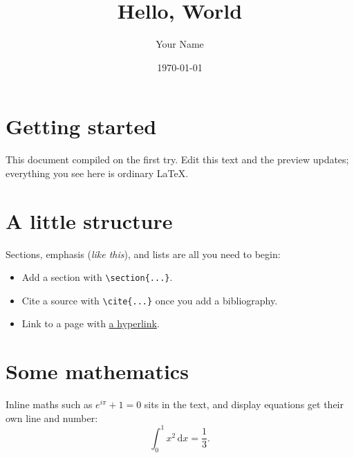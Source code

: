 \documentclass[11pt, a4paper]{article}
\title{Hello, World}
\author{Your Name}
\date{\today}
\begin{document}
\maketitle

\section{Getting started}
This document compiled on the first try. Edit this text and the preview
updates; everything you see here is ordinary \LaTeX{}.

\section{A little structure}
Sections, emphasis (\emph{like this}), and lists are all you need to begin:
\begin{itemize}
  \item Add a section with \verb|\section{...}|.
  \item Cite a source with \verb|\cite{...}| once you add a bibliography.
  \item Link to a page with \href{https://latextemplates.com}{a hyperlink}.
\end{itemize}

\section{Some mathematics}
Inline maths such as $e^{i\pi} + 1 = 0$ sits in the text, and display
equations get their own line and number:
\begin{equation}
  \int_{0}^{1} x^{2}\,\mathrm{d}x = \frac{1}{3}.
\end{equation}
\end{document}
